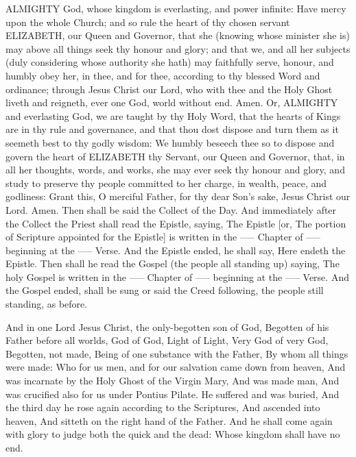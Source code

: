 ALMIGHTY God, whose kingdom is everlasting, and power infinite: Have mercy upon the whole Church; and so rule the heart of thy chosen servant ELIZABETH, our Queen and Governor, that she (knowing whose minister she is) may above all things seek thy honour and glory; and that we, and all her subjects (duly considering whose authority she hath) may faithfully serve, honour, and humbly obey her, in thee, and for thee, according to thy blessed Word and ordinance; through Jesus Christ our Lord, who with thee and the Holy Ghost liveth and reigneth, ever one God, world without end. Amen.
Or,
ALMIGHTY and everlasting God, we are taught by thy Holy Word, that the hearts of Kings are in thy rule and governance, and that thou dost dispose and turn them as it seemeth best to thy godly wisdom: We humbly beseech thee so to dispose and govern the heart of ELIZABETH thy Servant, our Queen and Governor, that, in all her thoughts, words, and works, she may ever seek thy honour and glory, and study to preserve thy people committed to her charge, in wealth, peace, and godliness: Grant this, O merciful Father, for thy dear Son's sake, Jesus Christ our Lord. Amen.
Then shall be said the Collect of the Day. And immediately after the Collect the Priest shall read the Epistle, saying, The Epistle [or, The portion of Scripture appointed for the Epistle] is written in the ----- Chapter of ----- beginning at the ----- Verse. And the Epistle ended, he shall say, Here endeth the Epistle. Then shall he read the Gospel (the people all standing up) saying, The holy Gospel is written in the ----- Chapter of ----- beginning at the ----- Verse. And the Gospel ended, shall be sung or said the Creed following, the people still standing, as before.


And in one Lord Jesus Christ, the only-begotten son of God, Begotten of his Father before all worlds, God of God, Light of Light, Very God of very God, Begotten, not made, Being of one substance with the Father, By whom all things were made: Who for us men, and for our salvation came down from heaven, And was incarnate by the Holy Ghost of the Virgin Mary, And was made man, And was crucified also for us under Pontius Pilate. He suffered and was buried, And the third day he rose again according to the Scriptures, And ascended into heaven, And sitteth on the right hand of the Father. And he shall come again with glory to judge both the quick and the dead: Whose kingdom shall have no end.

